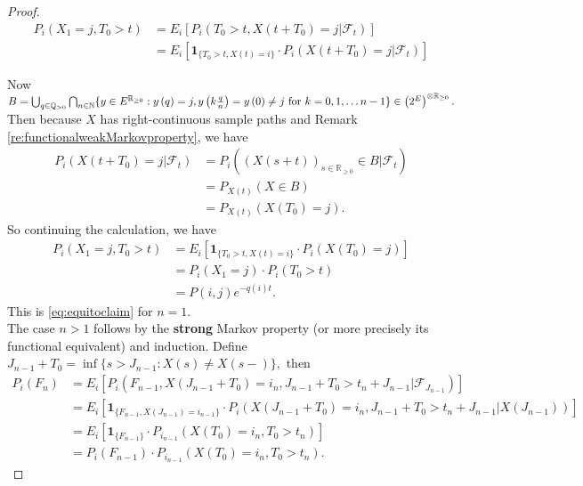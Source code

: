 \documentclass[12pt,a4paper]{scrartcl}
\numberwithin{equation}{section}
\newcommand{\R}{\mathbb{R}} %
\newcommand{\Q}{\mathbb{Q}} %
\newcommand{\N}{\mathbb{N}} %
\begin{document}
\begin{proof}
\begin{align*}
P_i\left(X_1 = j, T_0 > t\right) &= E_i\left[P_i\left( T_0 > t, X\left(t+T_0\right) = j | \mathcal{F}_t\right)\right] \\
&= E_i\left[\textbf{1}_{\lbrace T_0 > t, X\left(t\right) = i\rbrace } \cdot P_i\left( X\left(t+T_0\right) = j | \mathcal{F}_t\right) \right]
\end{align*}

Now $B = \bigcup_{q \in \Q_{>0}} \bigcap_{n \in \N} \lbrace y \in E^{\R_{\geq 0}}: y\left(q\right) = j , y\left(k \frac{q}{n} \right) = y\left(0\right) \neq j \textnormal{ for } k=0,1,\ldots n-1 \rbrace  \in \left(2^{E} \right)^{\otimes \R_{\geq 0}}.$
Then because $X$ has right-continuous sample paths and Remark \ref{re:functionalweakMarkovproperty}, we have
\begin{align*}
P_i\left(X\left(t+T_0\right) = j |\mathcal{F}_t \right) &= P_i\left(\left(X\left(s+t\right) \right)_{s \in \R_{\geq 0}} \in B |\mathcal{F}_t\right) \\
&= P_{X\left(t\right)}\left(X \in B\right) \\
&=P_{X\left(t\right)}\left(X\left(T_0\right) = j \right).
\end{align*}
So continuing the calculation, we have
\begin{align*}
P_i\left(X_1 = j, T_0 > t\right) &= E_i\left[\textbf{1}_{\lbrace T_0 > t, X\left(t\right) = i\rbrace } \cdot P_i\left(X\left(T_0\right) = j\right) \right] \\
&= P_i\left(X_1 = j \right) \cdot P_i\left(T_0 > t\right) \\
&= P\left(i,j\right) e^{-q\left(i\right)t}.
\end{align*}
This is \eqref{eq:equitoclaim} for $ n = 1 $.\\[2ex]
The case $ n > 1 $ follows by the \textbf{strong} Markov property (or more precisely its functional equivalent) and induction. Define $ J_{n-1} + T_0 = \inf\lbrace s > J_{n-1}: X\left(s\right) \neq X\left(s-\right)\rbrace ,$ then
\begin{align*}
P_i\left(F_n\right) &= E_i\left[P_i\left(F_{n-1}, X\left( J_{n-1}+T_0\right) = i_n, J_{n-1} + T_0 > t_n + J_{n-1} |\mathcal{F}_{J_{n-1}}\right)\right] \\
& = E_i\left[\textbf{1}_{\lbrace F_{n-1}, X\left(J_{n-1}\right) = i_{n-1}\rbrace } \cdot P_i\left( X\left(J_{n-1}+T_0\right) = i_n, J_{n-1} + T_0 > t_n + J_{n-1} | X\left(J_{n-1}\right)\right)\right] \\
&= E_i\left[\textbf{1}_{\lbrace F_{n-1}\rbrace } \cdot P_{i_{n-1}}\left(X\left(T_0\right) = i_n, T_0 > t_n\right) \right] \\
&= P_i\left(F_{n-1}\right) \cdot P_{i_{n-1}}\left(X\left(T_0\right) = i_n, T_0 > t_n\right).
\end{align*}
\end{proof}
\end{document}
